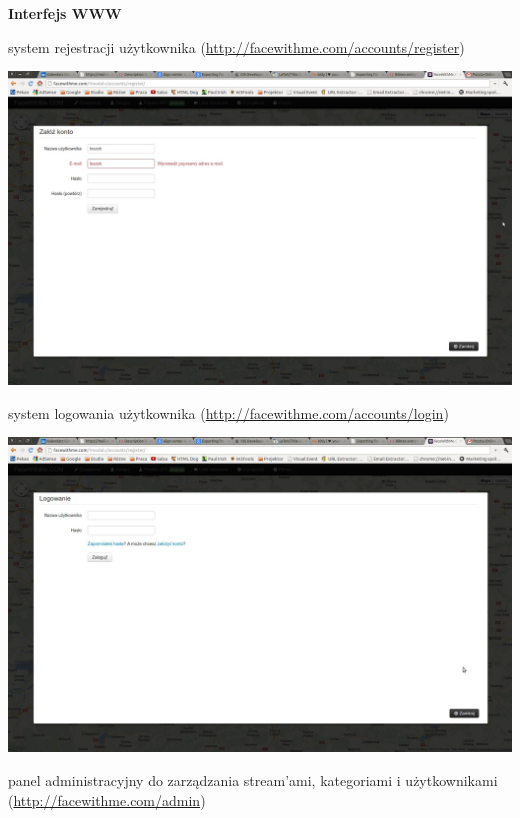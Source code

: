 \newpage
\textbf{Interfejs WWW}
\begin{packed_item}
    \item{system rejestracji użytkownika (\url{http://facewithme.com/accounts/register})
        \begin{center}
            \includegraphics[width=\textwidth]{img/screens/interfejs_www/rejestracja.jpg}
        \end{center}
    }
    \item{system logowania użytkownika (\url{http://facewithme.com/accounts/login})
        \begin{center}
            \includegraphics[width=\textwidth]{img/screens/interfejs_www/logowanie.jpg}
        \end{center}
    }
    \item{panel administracyjny do zarządzania stream'ami, kategoriami i użytkownikami (\url{http://facewithme.com/admin})
        \begin{center}

\end{center}}
\end{packed_item}
